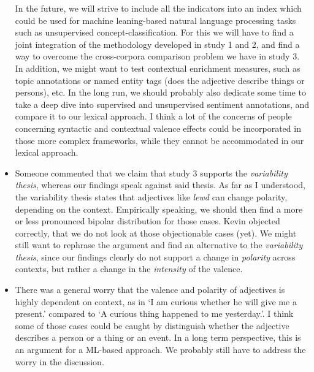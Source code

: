 \documentclass{article}
\begin{document}
\begin{itemize}
In the future, we will strive to include all the indicators into an index which could be used for machine leaning-based natural language processing tasks such as unsupervised concept-classification. For this we will have to find a joint integration of the methodology developed in study 1 and 2, and find a way to overcome the cross-corpora comparison problem we have in study 3. In addition, we might want to test contextual enrichment measures, such as topic annotations or named entity tags (does the adjective describe things or persons), etc. In the long run, we should probably also dedicate some time to take a deep dive into supervised and unsupervised sentiment annotations, and compare it to our lexical approach. I think a lot of the concerns of people concerning syntactic and contextual valence effects could be incorporated in those more complex frameworks, while they cannot be accommodated in our lexical approach. 

\item Someone commented that we claim that study 3 supports the \textit{variability thesis}, whereas our findings speak against said thesis. As far as I understood, the variability thesis states that adjectives like \textit{lewd} can change polarity, depending on the context. Empirically speaking, we should then find a more or less pronounced bipolar distribution for those cases. Kevin objected correctly, that we do not look at those objectionable cases (yet). We might still want to rephrase the argument and find an alternative to the \textit{variability thesis}, since our findings clearly do not support a change in \textit{polarity} across contexts, but rather a change in the \textit{intensity} of the valence.

\item There was a general worry that the valence and polarity of adjectives is highly dependent on context, as in `I am curious whether he will give me a present.' compared to `A curious thing happened to me yesterday.'. I think some of those cases could be caught by distinguish whether the adjective describes a person or a thing or an event. In a long term perspective, this is an argument for a ML-based approach. We probably still have to address the worry in the discussion.


\end{itemize}
\end{document}
